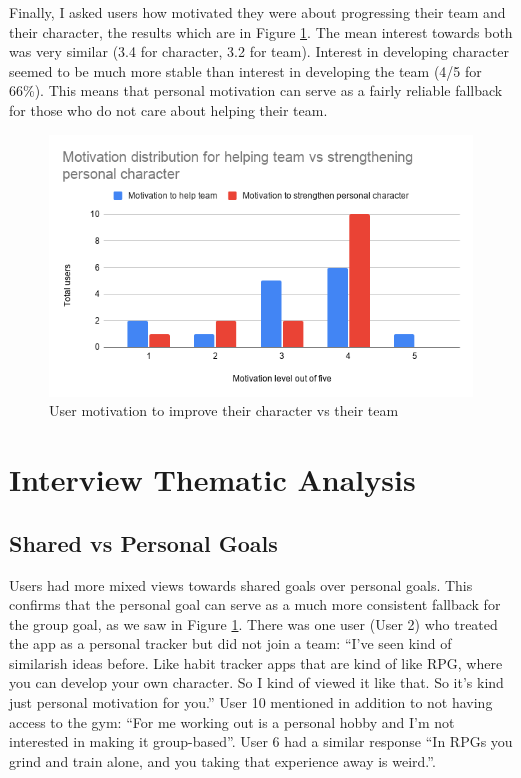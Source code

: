 \documentclass{l4proj}
\begin{document}
Finally, I asked users how motivated they were about progressing their team and their character, the results which are in Figure \ref{fig:character_vs_team}. The mean interest towards both was very similar (3.4 for character, 3.2 for team). Interest in developing character seemed to be much more stable than interest in developing the team (4/5 for 66\%). This means that personal motivation can serve as a fairly reliable fallback for those who do not care about helping their team. 
\begin{figure}[H]
    \centering
    \includegraphics[width=1.0\linewidth]{moviation_distribution_team_character.png}    
    \caption{User motivation to improve their character vs their team}
    \label{fig:character_vs_team} 
\end{figure}




\section{Interview Thematic Analysis}
\subsection{Shared vs Personal Goals}
Users had more mixed views towards shared goals over personal goals. This confirms that the personal goal can serve as a much more consistent fallback for the group goal, as we saw in Figure \ref{fig:character_vs_team}. There was one user (User 2) who treated the app as a personal tracker but did not join a team: ``I've seen kind of similarish ideas before. Like habit tracker apps that are kind of like RPG, where you can develop your own character. So I kind of viewed it like that. So it's kind just personal motivation for you.''  User 10 mentioned in addition to not having access to the gym: ``For me working out is a personal hobby and I'm not interested in making it group-based''. User 6 had a similar response ``In RPGs you grind and train alone, and you taking that experience away is weird.''. 
\end{document}

